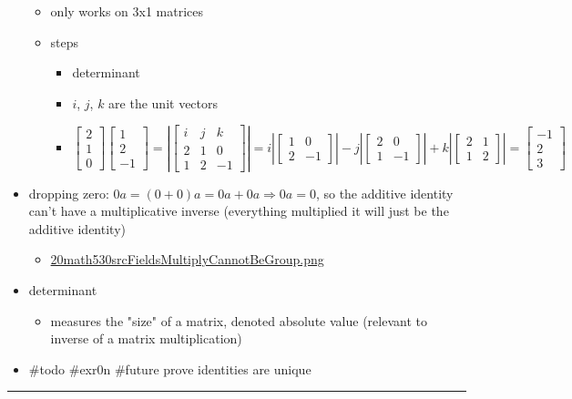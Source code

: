\documentclass[letterpaper]{article}
\begin{document}
\begin{itemize}
\begin{itemize}
\item only works on 3x1 matrices
\item steps

\begin{itemize}
\item determinant
\item \(i\), \(j\), \(k\) are the unit vectors
\item \[\begin{bmatrix}2\\1\\0\end{bmatrix}\begin{bmatrix}1\\2\\-1\end{bmatrix} =
        \left|\begin{bmatrix}i &j &k\\2 &1 &0\\1 &2 &-1\end{bmatrix}\right| = i\left|\begin{bmatrix}1&0\\2&-1\end{bmatrix}\right|-j\left|\begin{bmatrix}2&0\\1&-1\end{bmatrix}\right| + k\left|\begin{bmatrix}2&1\\1&2\end{bmatrix}\right| = \begin{bmatrix}-1\\2\\3\end{bmatrix}\]
\end{itemize}
\end{itemize}

\item dropping zero: \(0a = (0+0)a = 0a+0a \Rightarrow 0a = 0\), so the
additive identity can't have a multiplicative inverse (everything
multiplied it will just be the additive identity)

\begin{itemize}
\item \href{20math530srcFieldsMultiplyCannotBeGroup.png.org}{20math530srcFieldsMultiplyCannotBeGroup.png}
\end{itemize}

\item determinant

\begin{itemize}
\item measures the "size" of a matrix, denoted absolute value (relevant to
inverse of a matrix multiplication)
\end{itemize}

\item \#todo \#exr0n \#future prove identities are unique
\end{itemize}

\noindent\rule{\textwidth}{0.5pt}
\end{document}
